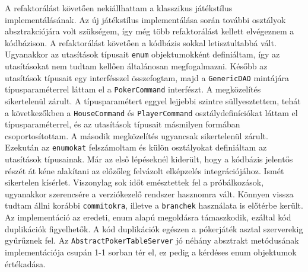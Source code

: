 A refaktorálást követően nekiállhattam a klasszikus játékstílus implementálásának. Az új játékstílus implementálása során további osztályok absztrakciójára volt szükségem, így még több refaktorálást kellett elvégeznem a kódbázison. A refaktorálást követően a kódbázis sokkal letisztultabbá vált. Ugyanakkor az utasítások típusait \texttt{enum} objektumokként definiáltam, így az utasításokat nem tudtam kellően általánosan megfogalmazni. Később az utasítások típusait egy interfésszel összefogtam, majd a \texttt{GenericDAO} mintájára típusparaméterrel láttam el a \texttt{PokerCommand} interfészt. A megközelítés sikertelenül zárult. A típusparamétert eggyel lejjebbi szintre süllyesztettem, tehát a következőkben a \texttt{HouseCommand} és \texttt{PlayerCommand} osztálydefiníciókat láttam el típusparaméterrel, és az utasítások típusait másmilyen formában csoportosítottam. A második megközelítés ugyancsak sikertelenül zárult. Ezekután az \texttt{enumokat} felszámoltam és külön osztályokat definiáltam az utasítások típusainak. Már az első lépéseknél kiderült, hogy a kódbázis jelentős részét át kéne alakítani az előzőleg felvázolt elképzelés integrációjához. Ismét sikertelen kísérlet. Viszonylag sok időt emésztettek fel a próbálkozások, ugyanakkor szerencsére a verziókezelő rendszer hasznomra vált. Könnyen vissza tudtam állni korábbi \texttt{commitokra}, illetve a \texttt{branchek} használata is előtérbe került. \\
Az implementáció az eredeti, enum alapú megoldásra támaszkodik, ezáltal kód duplikációk figyelhetők. A kód duplikációk egészen a pókerjáték asztal szerverekig  gyűrűznek fel. Az \texttt{AbstractPokerTableServer} jó néhány absztrakt metódusának implementációja csupán 1-1 sorban tér el, ez pedig a kérdéses enum objektumok értékadása.

